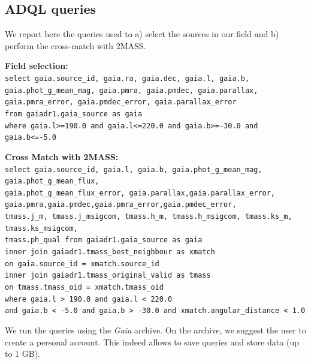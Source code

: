 \documentclass[onecolumn]{aa} %
\begin{document}
\begin{appendix}
\onecolumn
\section{ADQL queries}\label{App:ADQL}
We report here the queries used to a) select the sources in our field and b) perform the cross-match with 2MASS. \\
\noindent

\vspace{0.5cm}
\noindent
\textbf{Field selection: \\} 
\noindent
\texttt{select gaia.source\_id, gaia.ra, gaia.dec, gaia.l, gaia.b, gaia.phot\_g\_mean\_mag, gaia.pmra, gaia.pmdec, gaia.parallax, 
gaia.pmra\_error, gaia.pmdec\_error, gaia.parallax\_error  \\
from gaiadr1.gaia\_source as gaia \\
where gaia.l>=190.0 and gaia.l<=220.0 and gaia.b>=-30.0 and gaia.b<=-5.0}

\vspace{0.5cm}
\noindent
\textbf{Cross Match with 2MASS: \\} 
\noindent
\texttt{select gaia.source\_id, gaia.l, gaia.b, gaia.phot\_g\_mean\_mag, 
gaia.phot\_g\_mean\_flux, \\ gaia.phot\_g\_mean\_flux\_error,
gaia.parallax,gaia.parallax\_error, \\gaia.pmra,gaia.pmdec,gaia.pmra\_error,gaia.pmdec\_error, \\
 tmass.j\_m, tmass.j\_msigcom, tmass.h\_m, tmass.h\_msigcom, tmass.ks\_m,  tmass.ks\_msigcom,  \\ tmass.ph\_qual
from gaiadr1.gaia\_source as gaia \\
inner join gaiadr1.tmass\_best\_neighbour as xmatch \\
on gaia.source\_id = xmatch.source\_id \\
inner join gaiadr1.tmass\_original\_valid as tmass \\
on tmass.tmass\_oid = xmatch.tmass\_oid \\
where gaia.l > 190.0 and gaia.l < 220.0 \\and gaia.b < -5.0 and gaia.b > -30.0 and xmatch.angular\_distance < 1.0}

\vspace{0.5cm}
\noindent
We run the queries using the \textit{Gaia} archive. On the archive, we suggest the user to create a personal account. This indeed allows to save queries and store data (up to 1 GB).


\end{appendix}
\end{document}
